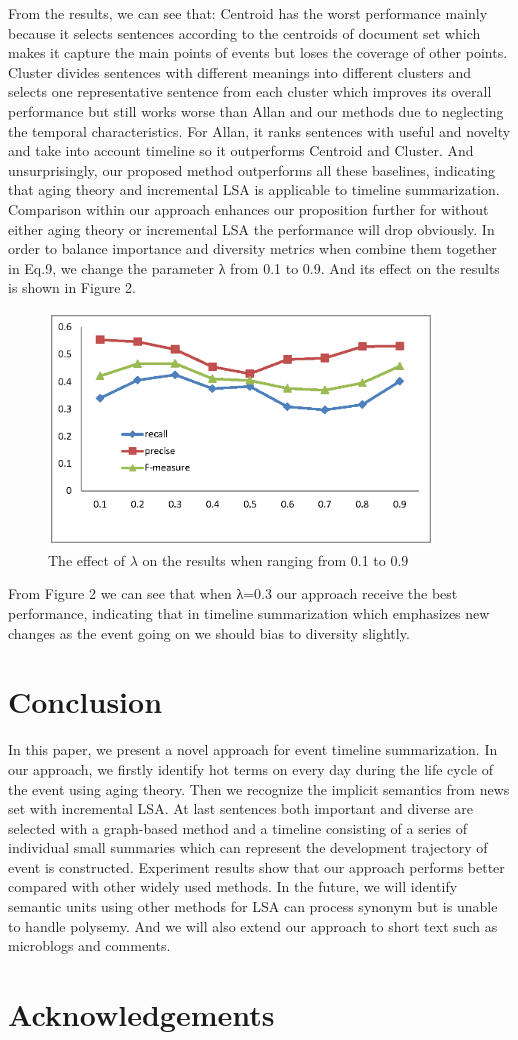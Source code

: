 \documentclass[runningheads,a4paper]{llncs}
\begin{document}
From the results, we can see that:
Centroid has the worst performance mainly because it selects sentences according to the centroids of document set which makes it capture the main points of events but loses the coverage of other points. Cluster divides sentences with different meanings into different clusters and selects one representative sentence from each cluster which improves its overall performance but still works worse than Allan and our methods due to neglecting the temporal characteristics. For Allan, it ranks sentences with useful and novelty and take into account timeline so it outperforms Centroid and Cluster. And unsurprisingly, our proposed method outperforms all these baselines, indicating that aging theory and incremental LSA is applicable to timeline summarization. Comparison within our approach enhances our proposition further for without either aging theory or incremental LSA the performance will drop obviously.
In order to balance importance and diversity metrics when combine them together in Eq.9, we change the parameter λ from 0.1 to 0.9. And its effect on the results is shown in Figure 2.

\begin{figure}
\centering
\includegraphics[height=6.2cm]{lambda}
\caption{The effect of $\lambda$ on the results when ranging from 0.1 to 0.9}
\label{fig:zhuzhuangtu}
\end{figure}


From Figure 2 we can see that when λ=0.3 our approach receive the best performance, indicating that in timeline summarization which emphasizes new changes as the event going on we should bias to diversity slightly.

\section{Conclusion}
In this paper, we present a novel approach for event timeline summarization. In our approach, we firstly identify hot terms on every day during the life cycle of the event using aging theory. Then we recognize the implicit semantics from news set with incremental LSA. At last sentences both important and diverse are selected with a graph-based method and a timeline consisting of a series of individual small summaries which can represent the development trajectory of event is constructed. Experiment results show that our approach performs better compared with other widely used methods.
In the future, we will identify semantic units using other methods for LSA can process synonym but is unable to handle polysemy. And we will also extend our approach to short text such as microblogs and comments.

\section{Acknowledgements}





\end{document}
